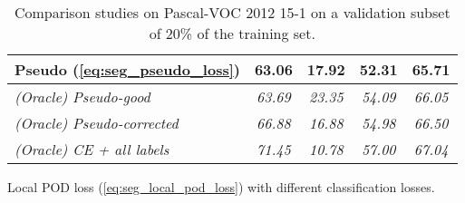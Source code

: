 \begin{table}
\begin{subtable}{\textwidth}
\begin{tabular}{@{}l|cccc@{}}
            Pseudo (\autoref{eq:seg_pseudo_loss}) & \textbf{63.06} & \textbf{17.92}    & \textbf{52.31} & \textbf{65.71} \\
            \midrule
            \textit{(Oracle) Pseudo-good}         & \textit{63.69} & \textit{23.35}    & \textit{54.09} & \textit{66.05} \\
            \textit{(Oracle) Pseudo-corrected}    & \textit{66.88} & \textit{16.88}    & \textit{54.98} & \textit{66.50} \\
            \textit{(Oracle) CE + all labels}     & \textit{71.45} & \textit{10.78}    & \textit{57.00} & \textit{67.04} \\
            \bottomrule
        \end{tabular}
        \caption{Local POD loss (\autoref{eq:seg_local_pod_loss}) with different classification losses.}
        \label{tab:seg_ablation_classif}
    \end{subtable}
    \caption{Comparison studies on Pascal-VOC 2012 15-1 on a validation subset of 20\% of the training set.}
    \label{tab:seg_ablation_distill_classif}
\end{table}



